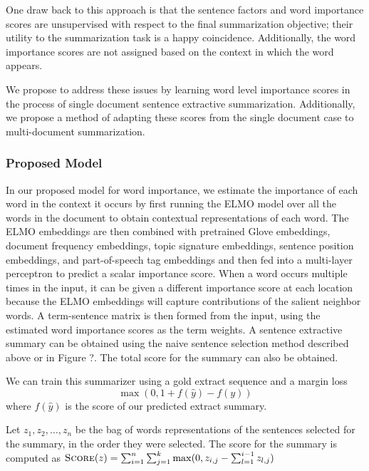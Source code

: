 One draw back to this approach is that the sentence factors and word 
importance scores are unsupervised with respect to the final summarization
objective; their utility to the summarization task is a happy coincidence.
Additionally, the word importance scores are not assigned based on the 
context in which the word appears.

We propose to address these issues by learning word level importance 
scores in the process of single document sentence extractive summarization.
Additionally, we propose a method of adapting these scores from the 
single document case to multi-document summarization.

\subsubsection{Proposed Model}


In our proposed model for word importance, we estimate the importance of
each word in the context it occurs by first running the ELMO model
over all the words in the document to obtain contextual representations
of each word. The ELMO embeddings are then combined with pretrained Glove
embeddings, document frequency embeddings, topic signature embeddings,
sentence position embeddings, and part-of-speech tag embeddings and then
fed into a multi-layer perceptron to predict a scalar importance score.
When a word occurs multiple times in the input, it can be given a different 
importance score at each location because the ELMO embeddings will capture
contributions of the salient neighbor words. A term-sentence matrix is 
then formed from the input, using the estimated word importance scores 
as the term weights. A sentence extractive summary can be obtained 
using the naive sentence selection method described above or in Figure ?.
The total score for the summary can also be obtained.

We can train this summarizer using a gold extract sequence and a margin loss
\[  \max\left(0, 1 + f(\hat{y}) - f(y) \right) \] where $f(\hat{y})$ is
the score of our predicted extract summary.


Let $z_1, z_2, \dots, z_n$ be the bag of words representations of the 
sentences selected for the summary, in the order they were selected.
The score for the summary is computed as 
$\textsc{Score}(z) = \sum_{i=1}^n \sum_{j=1}^k \max(0, z_{i,j} - \sum_{l=1}^{i-1} z_{l,j})$ 


~\\
~\\

